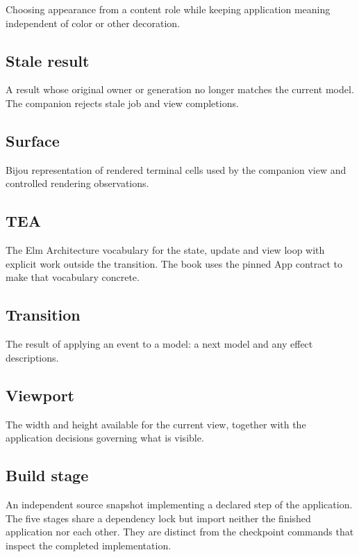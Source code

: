 Choosing appearance from a content role while keeping application meaning independent of color or other decoration.

\subsection{Stale result}

A result whose original owner or generation no longer matches the current model. The companion rejects stale job and view completions.

\subsection{Surface}

Bijou representation of rendered terminal cells used by the companion view and controlled rendering observations.

\subsection{TEA}

The Elm Architecture vocabulary for the state, update and view loop with explicit work outside the transition. The book uses the pinned App contract to make that vocabulary concrete.

\subsection{Transition}

The result of applying an event to a model: a next model and any effect descriptions.

\subsection{Viewport}

The width and height available for the current view, together with the application decisions governing what is visible.

\subsection{Build stage}

An independent source snapshot implementing a declared step of the application. The five stages share a dependency lock but import neither the finished application nor each other. They are distinct from the checkpoint commands that inspect the completed implementation.
